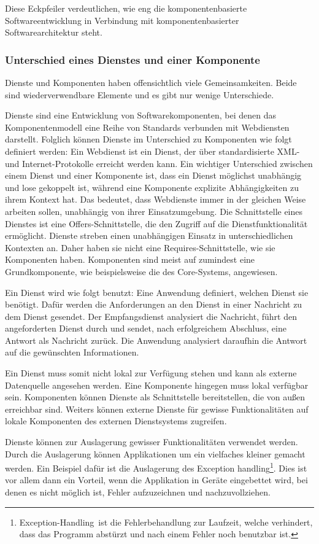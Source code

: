 Diese Eckpfeiler verdeutlichen, wie eng die komponentenbasierte Softwareentwicklung in Verbindung mit komponentenbasierter Softwarearchitektur steht.

\subsubsection{Unterschied eines Dienstes und einer Komponente}
\label{sec:2_Unterschied_Dienst_Komponente}
Dienste und Komponenten haben offensichtlich viele Gemeinsamkeiten. Beide sind wiederverwendbare Elemente und es gibt nur wenige Unterschiede.

Dienste sind eine Entwicklung von Softwarekomponenten, bei denen das Komponentenmodell eine Reihe von Standards verbunden mit Webdiensten darstellt. Folglich können Dienste im Unterschied zu Komponenten wie folgt definiert werden:
Ein Webdienst ist ein Dienst, der über standardisierte XML- und Internet-Protokolle erreicht werden kann. Ein wichtiger Unterschied zwischen einem Dienst und einer Komponente ist, dass ein Dienst möglichst unabhängig und lose gekoppelt ist, während eine Komponente explizite Abhängigkeiten zu ihrem Kontext hat. Das bedeutet, dass Webdienste immer in der gleichen Weise arbeiten sollen, unabhängig von ihrer Einsatzumgebung. Die Schnittstelle eines Dienstes ist eine \glqq Offers\grqq -Schnittstelle, die den Zugriff auf die Dienstfunktionalität ermöglicht. Dienste streben einen unabhängigen Einsatz in unterschiedlichen Kontexten an. Daher haben sie nicht eine \glqq Requires\grqq -Schnittstelle, wie sie Komponenten haben. Komponenten sind meist auf zumindest eine \glqq Grundkomponente\grqq , wie beispielsweise die des Core-Systems, angewiesen.

Ein Dienst wird wie folgt benutzt:
Eine Anwendung definiert, welchen Dienst sie benötigt. Dafür werden die Anforderungen an den Dienst in einer Nachricht zu dem Dienst gesendet. Der Empfangsdienst analysiert die Nachricht, führt den angeforderten Dienst durch und sendet, nach erfolgreichem Abschluss, eine Antwort als Nachricht zurück. Die Anwendung analysiert daraufhin die Antwort auf die gewünschten Informationen.

Ein Dienst muss somit nicht lokal zur Verfügung stehen und kann als externe Datenquelle angesehen werden. Eine Komponente hingegen muss lokal verfügbar sein. Komponenten können Dienste als Schnittstelle bereitstellen, die von außen erreichbar sind. Weiters können externe Dienste für gewisse Funktionalitäten auf lokale Komponenten des externen Dienstsystems zugreifen.

Dienste können zur Auslagerung gewisser Funktionalitäten verwendet werden. Durch die Auslagerung können Applikationen um ein vielfaches kleiner gemacht werden. Ein Beispiel dafür ist die Auslagerung des \glqq Exception handling\footnote{\glqq Exception-Handling\grqq\ ist die Fehlerbehandlung zur Laufzeit, welche verhindert, dass das Programm abstürzt und nach einem Fehler noch benutzbar ist.}\grqq . Dies ist vor allem dann ein Vorteil, wenn die Applikation in Geräte eingebettet wird, bei denen es nicht möglich ist, Fehler aufzuzeichnen und nachzuvollziehen.